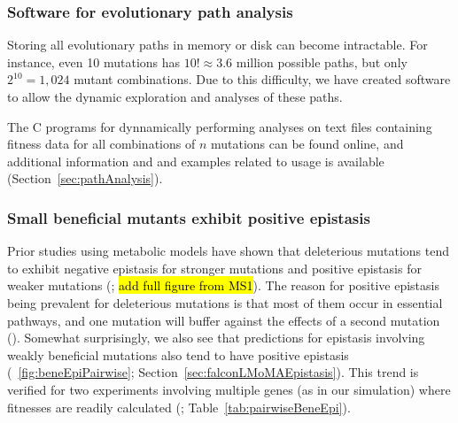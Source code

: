 \subsubsection{Software for evolutionary path analysis}

Storing all evolutionary paths in memory or disk can become 
intractable. For instance, even 10 mutations has $10! \approx
3.6$ million possible paths, but only $2^{10} = 1,024$ mutant
combinations. Due to this difficulty, we have created software to allow 
the dynamic exploration and analyses of these paths. 

The C programs for dynnamically performing analyses on text files
containing fitness data for all combinations of $n$ mutations can be
found online, and additional information and and examples related to
usage is available (\suppOrApp Section~\ref{sec:pathAnalysis}).

\subsubsection{Small beneficial mutants exhibit positive epistasis}

Prior studies using metabolic models have shown that deleterious
mutations tend to exhibit negative epistasis for stronger mutations
and positive epistasis for weaker mutations (\citep{He2010, Xu2012};
\hl{add full figure from MS1}). The reason for positive epistasis
being prevalent for deleterious mutations is that most of them occur
in essential pathways, and one mutation will buffer against the
effects of a second mutation (\citep{Xu2012}). Somewhat surprisingly,
we also see that predictions for epistasis involving weakly beneficial
mutations also tend to have positive epistasis
(\Fig~\ref{fig:beneEpiPairwise}; Section~\ref{sec:falconLMoMAEpistasis}). 
This trend is verified for two experiments involving
multiple genes (as in our simulation) where fitnesses are readily
calculated (\citep{Chou2011, Khan2011}; Table~\ref{tab:pairwiseBeneEpi}).


